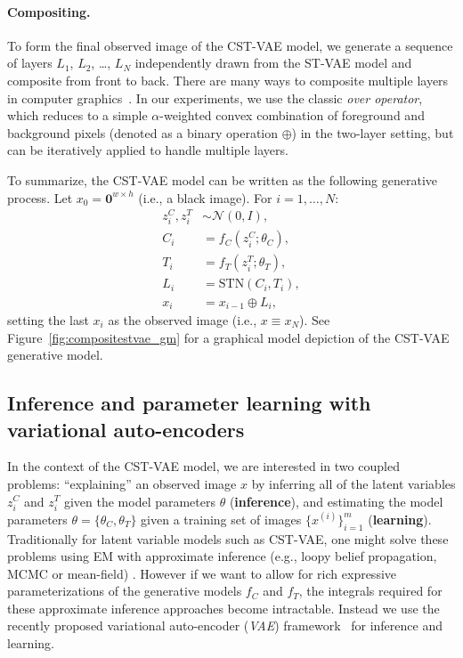 \paragraph{Compositing.}
To form the final observed image of the CST-VAE model, we generate a sequence of layers $L_1$, $L_2$, \dots, $L_N$
independently drawn from the ST-VAE model and composite from front to back.
There are many  ways to composite multiple layers in computer graphics~\citep{porter1984compositing}.
In our experiments, we use  the classic \emph{over operator}, which reduces to a simple $\alpha$-weighted
convex combination of foreground and background pixels (denoted as a  binary  operation $\oplus$)
in the two-layer setting, but can be iteratively applied
to handle multiple layers. %

 

To summarize, the CST-VAE model can be written as the following generative process.  Let $x_0=\mathbf{0}^{w\times h}$ (i.e., a black image).   For $i=1,\dots,N$:
\begin{align*}
z_i^C, z_i^T  &\sim \mathcal{N}(0, I), \\
C_i &= f_C(z_i^C; \theta_C), \\
T_i &= f_T(z_i^T; \theta_T), \\
L_i &= \mbox{STN}(C_i, T_i), \\
x_i &= x_{i-1} \oplus L_i,
\end{align*}
setting the last $x_i$ as the observed image (i.e., $x\equiv x_N$). 
See Figure~\ref{fig:compositestvae_gm} for
 a graphical model depiction of the CST-VAE generative model.




\subsection{Inference and parameter learning with variational auto-encoders}

In the context of the CST-VAE model, we are  interested in two coupled problems:
``explaining'' an observed image $x$ by inferring all of the latent variables $z^C_i$ and $z^T_i$ given the model parameters $\theta$  (\textbf{inference}), and 
 estimating the model parameters $\theta=\{\theta_C,\theta_T\}$ given a training set of images $\{x^{(i)}\}_{i=1}^m$ (\textbf{learning}).  
Traditionally for  latent variable models such as CST-VAE,  one might solve these problems using EM 
with approximate inference (e.g., loopy belief propagation, MCMC or mean-field) . 
However if we want to allow for rich expressive parameterizations of the generative models $f_C$ and $f_T$, the integrals required
for these approximate inference approaches become intractable.  Instead we use the recently proposed 
variational auto-encoder (\emph{VAE}) framework~\citep{Kingma2014} for inference and learning.

